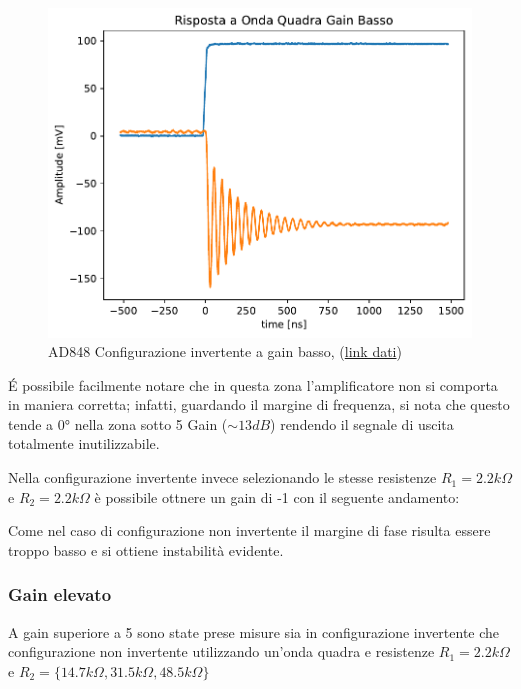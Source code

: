 \begin{figure}
    \centering
    \includegraphics[width=\linewidth]{analog/assets/AD848/Invertente/Inv_low_gain.pdf}
    \caption{AD848 Configurazione invertente a gain basso, (\href{https://github.com/Yedi278/Esperimentazioni-Elettronica/tree/main/-\%20OPAMP/AD848/Invertente/R1\%202.2k\%20R2\%202.2k\%20Instabilit\%C3\%A0/Quadra}{link dati})}
\end{figure}

$$$$
\'E possibile facilmente notare che in questa zona l'amplificatore non si comporta in maniera corretta; infatti, guardando il margine di frequenza, si nota che questo tende a 0° nella zona sotto 5 Gain ($\sim 13 dB$) rendendo il segnale di uscita totalmente inutilizzabile.

Nella configurazione invertente invece selezionando le stesse resistenze $R_1 = 2.2k\Omega$ e $R_2 = 2.2k\Omega$ è possibile ottnere un gain di -1 con il seguente andamento:


Come nel caso di configurazione non invertente il margine di fase risulta essere troppo basso e si ottiene instabilità evidente.

\pagebreak
\subsubsection{Gain elevato}

A gain superiore a 5 sono state prese misure sia in configurazione invertente che configurazione non invertente utilizzando un'onda quadra e resistenze $R_1 = 2.2k\Omega$ e $R_2 = \{ 14.7k\Omega, 31.5k\Omega, 48.5k\Omega \}$

